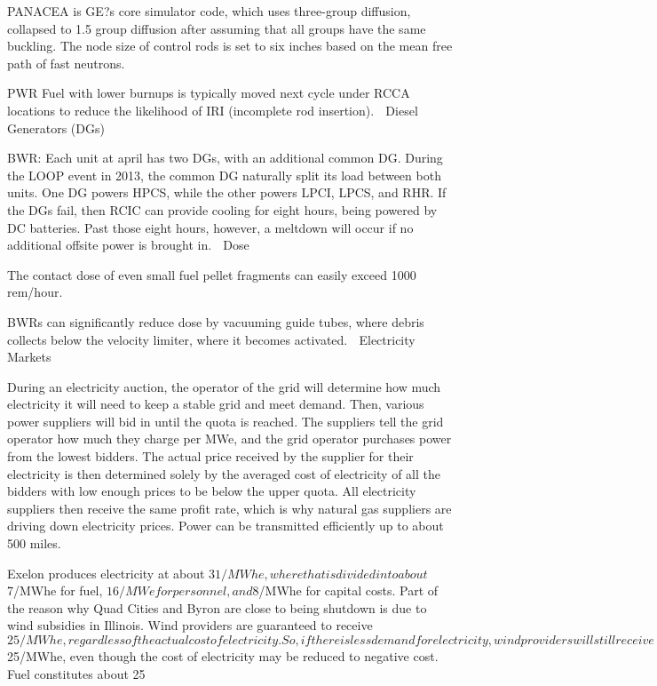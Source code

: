 \documentclass[10pt]{article}
\begin{document}
PANACEA is GE?s core simulator code, which uses three-group diffusion, collapsed to 1.5 group diffusion after assuming that all groups have the same buckling. The node size of control rods  is set to six inches based on the mean free path of fast neutrons. 

PWR
Fuel with lower burnups is typically moved next cycle under RCCA locations to reduce the likelihood of IRI (incomplete rod insertion). 
Diesel Generators (DGs)


BWR: Each unit at april has two DGs, with an additional common DG. During the LOOP event in 2013, the common DG naturally split its load between both units. One DG powers HPCS, while the other powers LPCI, LPCS, and RHR. If the DGs fail, then RCIC can provide cooling for eight hours, being powered by DC batteries. Past those eight hours, however, a meltdown will occur if no additional offsite power is brought in. 

Dose

The contact dose of even small fuel pellet fragments can easily exceed 1000 rem/hour. 

BWRs can significantly reduce dose by vacuuming guide tubes, where debris collects below the velocity limiter, where it becomes activated. 
Electricity Markets

During an electricity auction, the operator of the grid will determine how much electricity it will need to keep a stable grid and meet demand. Then, various power suppliers will bid in until the quota is reached. The suppliers tell the grid operator how much they charge per MWe, and the grid operator purchases power from the lowest bidders. The actual price received by the supplier for their electricity is then determined solely by the averaged cost of electricity of all the bidders with low enough prices to be below the upper quota. All electricity suppliers then receive the same profit rate, which is why natural gas suppliers are driving down electricity prices. Power can be transmitted efficiently up to about 500 miles. 

Exelon produces electricity at about $31/MWhe, where that is divided into about $7/MWhe for fuel, $16/MWe for personnel, and $8/MWhe for capital costs. Part of the reason why Quad Cities and Byron are close to being shutdown is due to wind subsidies in Illinois. Wind providers are guaranteed to receive $25/MWhe, regardless of the actual cost of electricity. So, if there is less demand for electricity, wind providers will still receive $25/MWhe, even though the cost of electricity may be reduced to negative cost. Fuel constitutes about 25%
\end{document}
